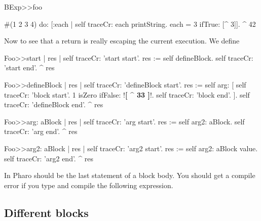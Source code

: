 \documentclass[a4paper,10pt,twoside]{book}
\begin{document}
\begin{code}{}
BExp>>foo
	
	#(1 2 3 4) do: [:each | self traceCr: each printString. 
						each = 3 
							ifTrue: [^ 3]].						
	^ 42
\end{code}

Now to see that a return is really escaping the current execution. 
We define 

\begin{code}{}
Foo>>start
	| res |
	self traceCr: 'start start'.
	res := self defineBlock.
	self traceCr: 'start end'.
	^ res
\end{code}

\begin{code}{}
Foo>>defineBlock
	| res |
	self traceCr: 'defineBlock start'.
	res := self arg: [ self traceCr: 'block start'. 
                            1 isZero ifFalse: !\textbf{[ \^{} 33 ]}!.
                            self traceCr: 'block end'. ].
	self traceCr: 'defineBlock end'.
	^ res
\end{code}

\begin{code}{}
Foo>>arg: aBlock
	| res |
	self traceCr: 'arg start'. 
	res := self arg2: aBlock.
	self traceCr: 'arg end'. 
	^ res 
\end{code}

\begin{code}{}
Foo>>arg2: aBlock
	| res |
	self traceCr: 'arg2 start'. 
	res := self arg2: aBlock value.
	self traceCr: 'arg2 end'. 
	^ res		
\end{code}




%	



In Pharo \ct{^} should be the last statement of a block body. You should get a compile error if you type and compile the following expression. 




\subsection{Different blocks} 
\end{document}
